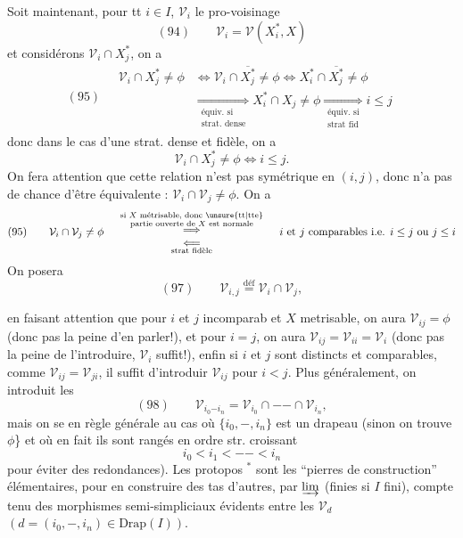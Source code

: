 Soit maintenant, pour tt $i\in I$, $\mathcal V_i$ le pro-voisinage
\[(94)\qquad\mathcal V_i=\mathcal V(X_i^*,X)\]
et considérons $\mathcal V_i\cap X_j^*$, on a
\[
(95)\quad\begin{aligned}
\mathcal V_i\cap X_j^*\neq\phi&\Longleftrightarrow\mathcal V_i\cap\overline{X_j^*}\neq\phi\Longleftrightarrow X_i^*\cap\overline{X_j^*}\neq\phi\\
&\underset{\substack{\text{équiv. si}\\\text{strat. dense}}}{\Longrightarrow}X_i^*\cap X_j\neq\phi\underset{\substack{\text{équiv. si}\\\text{strat fid}}}{\Longrightarrow}i\leq j
\end{aligned}
\]
donc dans le cas d'une strat. dense et fidèle,  on a
\[\mathcal V_i\cap X_j^*\neq\phi\Longleftrightarrow i\leq j.\]
On fera attention que cette relation n'est pas symétrique en $(i,j)$,  donc n'a pas de chance d'être équivalente : $\mathcal V_i\cap\mathcal V_j\neq\phi$. On a
\[
(95)\qquad\mathcal V_i\cap\mathcal V_j\neq\phi\quad
\begin{array}{c}
\overset{\substack{\text{si $X$ métrisable, donc \unsure{tt|tte}}\\\text{partie ouverte de $X$ est normale}}}{\Longrightarrow}\\
\underset{\text{strat fidèle}}{\Longleftarrow}
\end{array}
\quad\text{$i$ et $j$ comparables i.e. $i\leq j$ ou $j\leq i$}
\]
On posera
\[(97)\qquad\mathcal V_{i,j}\overset{\mathrm{déf}}=\mathcal V_i\cap\mathcal V_j,\]


en faisant attention que pour $i$ et $j$ incomparab et $X$ metrisable, on  aura $\mathcal V_{ij}=\phi$  (donc pas la peine d'en parler!), et pour $i=j$, on aura $\mathcal V_{ij}=\mathcal V_{ii}=\mathcal V_i$ (donc pas la peine de l'introduire, $\mathcal V_i$ suffit!), enfin  si $i$ et $j$ sont distincts et comparables,  comme $\mathcal V_{ij}=\mathcal V_{ji}$, il suffit d'introduir $\mathcal V_{ij}$ pour  $i<j$. Plus généralement, on introduit les
\[(98)\qquad\mathcal V_{i_0\mathord{-}i_n}=\mathcal V_{i_0}\cap\mathord{-}\mathord{-}\cap\mathcal V_{i_n},\]
mais on se  en règle générale au cas où $\{i_0,\mathord{-},i_n\}$ est un drapeau (sinon on trouve $\phi$\} et où en fait ils sont rangés en ordre str. croissant
\[i_0<i_1<\mathord{-}\mathord{-}<i_n\]
\unsure{(}pour éviter des redondances). Les protopos $^*$ sont les ``pierres de construction'' élémentaires, pour en construire des tas d'autres, par $\varinjlim$ (finies si $I$ fini), compte tenu des morphismes semi-simpliciaux évidents entre les $\mathcal V_d$ $(d=(i_0,\mathord{-},i_n)\in\mathrm{Drap}(I))$.
